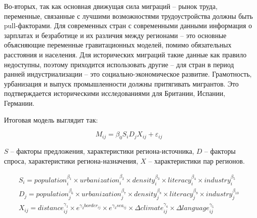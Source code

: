 \documentclass[a4paper,12pt]{article}
\begin{document}

Во-вторых, так как основная движущая сила миграций – рынок труда, переменные, связанные с лучшими возможностями трудоустройства должны быть pull-факторами. Для современных стран с современными данными информация о зарплатах и безработице и их различия между регионами – это основные объясняющие переменные гравитационных моделей, помимо обязательных расстояния и населения. Для исторических миграций такие данные как правило недоступны, поэтому приходится использовать другие -- для стран в период ранней индустриализации -- это социально-экономическое развитие. Грамотность, урбанизация и выпуск промышленности должны притягивать мигрантов. Это подтверждается историческими исследованиями для Британии, Испании, Германии. \citep{ silvestre_internal_2005, hochstadt_migration_1981, nicholas_internal_1987}

Итоговая модель выглядит так:

\begin{equation}\label{eq:extended}
	M_{ij} = \beta_0 S_{i} D_{j} X_{ij} + \varepsilon_{ij}
\end{equation}

$S$ – факторы предложения, характеристики региона-источника, $D$ – факторы спроса, характеристики региона-назначения, $X$ – характеристики пар регионов.

\begin{gather*}\label{eq:sdx}
	S_{i} = 
		\mathit{population}^{\beta_1}_{i} \times 
		\mathit{urbanization}^{\beta_2}_{i} \times 
		\mathit{density}^{\beta_3}_{i} \times 
		\mathit{literacy}^{\beta_4}_{i} \times 
		\mathit{industry}^{\beta_5}_{i} \\
	D_{j} = 
		\mathit{population}^{\beta_6}_{j} \times 
		\mathit{urbanization}^{\beta_7}_{j} \times 
		\mathit{density}^{\beta_8}_{j} \times 
		\mathit{literacy}^{\beta_9}_{j} \times 
		\mathit{industry}^{\beta_{10}}_{j} \\
	X_{ij} = 
		\mathit{distance}^{\gamma_1}_{ij} \times 
		e^{{\gamma_2} \mathit{border}_{ij}} \times 
		e^{{\gamma_3} \mathit{sea}_{ij}} \times 
		\Delta\mathit{climate}^{\gamma_4}_{ij} \times 
		\Delta\mathit{language}^{\gamma_5}_{ij} %
\end{gather*}
\end{document}
